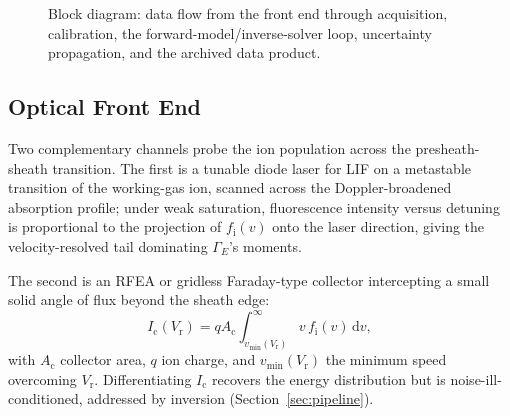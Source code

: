 \begin{figure}[htbp]
\centering
{}
\caption{Block diagram: data flow from the front end through acquisition, calibration, the forward-model/inverse-solver loop, uncertainty propagation, and the archived data product.}
\label{fig:architecture-block}
\end{figure}

\subsection{Optical Front End}
\label{sec:opt-front-end}

Two complementary channels probe the ion population across the presheath-sheath transition. The first is a tunable diode laser for LIF on a metastable transition of the working-gas ion, scanned across the Doppler-broadened absorption profile; under weak saturation, fluorescence intensity versus detuning is proportional to the projection of $f_{\mathrm{i}}(v)$ onto the laser direction, giving the velocity-resolved tail dominating $\Gamma_{E}$'s moments.

The second is an RFEA or gridless Faraday-type collector intercepting a small solid angle of flux beyond the sheath edge:
\begin{equation}
I_{\mathrm{c}}(V_{\mathrm{r}}) = q A_{\mathrm{c}} \int_{v_{\min}(V_{\mathrm{r}})}^{\infty} v\, f_{\mathrm{i}}(v)\, \mathrm{d}v ,
\label{eq:rfea-integral}
\end{equation}
with $A_{\mathrm{c}}$ collector area, $q$ ion charge, and $v_{\min}(V_{\mathrm{r}})$ the minimum speed overcoming $V_{\mathrm{r}}$. Differentiating $I_{\mathrm{c}}$ recovers the energy distribution but is noise-ill-conditioned, addressed by inversion (Section~\ref{sec:pipeline}).

